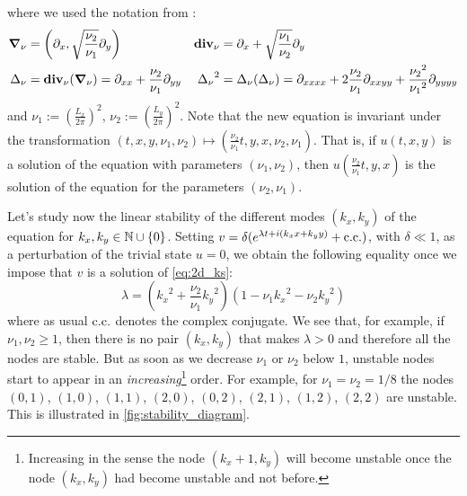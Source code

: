 \documentclass[twoside]{article}
\begin{document}
where we used the notation from \cite{Kalogirou2015}:
\begin{align}
  \grad_\nu & = \left(\partial_x , \sqrt{\frac{\nu_2}{\nu_1}} \partial_y
  \right)   & \operatorname{\boldsymbol{\mathrm{div}}}_\nu                                                   & = \partial_x + \sqrt{\frac{\nu_1}{\nu_2}} \partial_y
  \\ \Delta_\nu &= \operatorname{\boldsymbol{\mathrm{div}}}_\nu(\grad_\nu) = \partial_{xx} + \frac{\nu_2}{\nu_1} \partial_{yy} & {\Delta_\nu}^2 &= \Delta_\nu(\Delta_\nu) = \partial_{xxxx} + 2 \frac{\nu_2}{\nu_1} \partial_{xxyy} + \frac{{\nu_2}^2}{{\nu_1}^2} \partial_{yyyy}
\end{align}
and $\nu_1 :={\left( \frac{L_x}{2\pi} \right)}^2$, $\nu_2 := {\left( \frac{L_y}{2\pi} \right)}^2$. Note that the new equation is invariant under the transformation $(t,x,y, \nu_1, \nu_2) \mapsto \left( \frac{\nu_2}{\nu_1} t, y, x, \nu_2, \nu_1 \right)$. That is, if $u(t,x,y)$ is a solution of the equation with parameters $(\nu_1, \nu_2)$, then $u\left( \frac{\nu_2}{\nu_1} t, y, x \right)$ is the solution of the equation for the parameters $(\nu_2, \nu_1)$.

Let's study now the linear stability of the different modes $(k_x, k_y)$ of the equation for $k_x,k_y\in\mathbb{N}\cup\{0\}$. Setting $v = \delta(e^{\lambda t+i(k_x x + k_y y)} + \mathrm{c.c.})$, with $\delta \ll 1$, as a perturbation of the trivial state $u = 0$, we obtain the following equality once we impose that $v$ is a solution of \cref{eq:2d_ks}:
\begin{equation}
  \lambda = \left({k_x}^2+ \frac{\nu_2}{\nu_1} {k_y}^2\right)\left( 1 - \nu_1{k_x}^2 - \nu_2{k_y}^2\right)
\end{equation}
where as usual $\mathrm{c.c.}$ denotes the complex conjugate.
We see that, for example, if $\nu_1, \nu_2 \geq 1$, then there is no pair $(k_x, k_y)$ that makes $\lambda > 0$ and therefore all the nodes are stable. But as soon as we decrease $\nu_1$ or $\nu_2$ below $1$, unstable nodes start to appear in an \emph{increasing}\footnote{Increasing in the sense the node $(k_x+1,k_y)$ will become unstable once the node $(k_x,k_y)$ had become unstable and not before.} order. For example, for $\nu_1=\nu_2=1/8$ the nodes $(0,1)$, $(1,0)$, $(1,1)$, $(2,0)$, $(0,2)$, $(2,1)$, $(1,2)$, $(2,2)$ are unstable. This is illustrated in \cref{fig:stability_diagram}.

{}
\printbibliography
\end{document}
